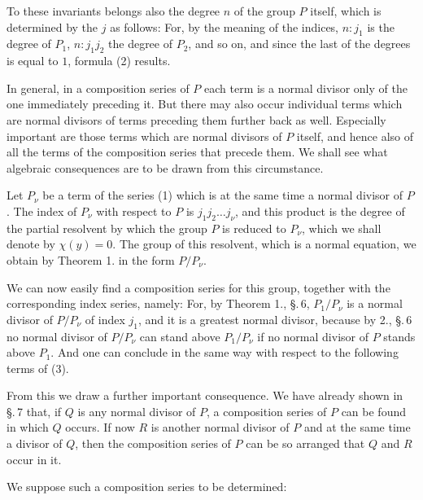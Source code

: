 
To these invariants belongs also the degree $n$ of the group $P$ itself, which is
determined by the $j$ as follows:
For, by the meaning of the indices, $n : j_1$ is the degree of $P_1$, $n : j_1 j_2$
the degree of $P_2$, and so on, and since the last of the degrees is equal to $1$,
formula (2) results.

In general, in a composition series of $P$ each term is a normal divisor only of
the one immediately preceding it. But there may also occur individual terms which
are normal divisors of terms preceding them further back as well. Especially
important are those terms which are normal divisors of $P$ itself, and hence also
of all the terms of the composition series that precede them. We shall see what
algebraic consequences are to be drawn from this circumstance.

Let $P_\nu$ be a term of the series (1) which is at the same time a normal divisor
of $P$. The index of $P_\nu$ with respect to $P$ is $j_1 j_2 \ldots j_\nu$, and
this product is the degree of the partial resolvent by which the group $P$ is
reduced to $P_\nu$, which we shall denote by $\chi(y) = 0$. The group of this
resolvent, which is a normal equation, we obtain by Theorem 1. in the form
$P/P_\nu$.

We can now easily find a composition series for this group, together with the
corresponding index series, namely:
For, by Theorem 1., \S.\,6, $P_1/P_\nu$ is a normal divisor of $P/P_\nu$ of
index $j_1$, and it is a greatest normal divisor,
because by 2., \S.\,6 no normal divisor of $P/P_\nu$ can stand above $P_1/P_\nu$
if no normal divisor of $P$ stands above $P_1$. And one can conclude in the same
way with respect to the following terms of (3).

From this we draw a further important consequence. We have already shown in
\S.\,7 that, if $Q$ is any normal divisor of $P$, a composition series of $P$ can
be found in which $Q$ occurs. If now $R$ is another normal divisor of $P$ and at
the same time a divisor of $Q$, then the composition series of $P$ can be so
arranged that $Q$ and $R$ occur in it.

We suppose such a composition series to be determined:
